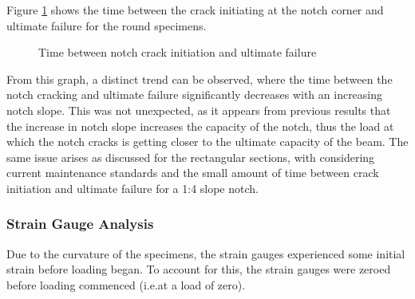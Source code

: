 \documentclass[11pt,a4paper]{article}
\numberwithin{equation}{subsection}
\begin{document}
\vspace*{\baselineskip}
\noindent
Figure \ref{fig:Round-Crack-fail} shows the time between the crack initiating at the notch corner and ultimate failure for the round specimens.

\begin{figure}[h]
	\begin{center}
	\end{center}
	\caption{Time between notch crack initiation and ultimate failure}
	\label{fig:Round-Crack-fail}
\end{figure}

From this graph, a distinct trend can be observed, where the time between the notch cracking and ultimate failure significantly decreases with an increasing notch slope. This was not unexpected, as it appears from previous results that the increase in notch slope increases the capacity of the notch, thus the load at which the notch cracks is getting closer to the ultimate capacity of the beam. The same issue arises as discussed for the rectangular sections, with considering current maintenance standards and the small amount of time between crack initiation and ultimate failure for a 1:4 slope notch.

\subsubsection{Strain Gauge Analysis}
Due to the curvature of the specimens, the strain gauges experienced some initial strain before loading began. To account for this, the strain gauges were zeroed before loading commenced (i.e.at a load of zero).
\end{document}
